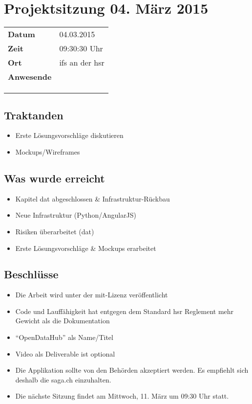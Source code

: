 \documentclass[class=scrbook,crop=false]{standalone}
\begin{document}
	
	\section{Projektsitzung 04. März 2015}
	
	\begin{tabular}{ll}
		\textbf{Datum} & 04.03.2015 \\
		\textbf{Zeit} & 09:30\textendash10:30 Uhr \\
		\textbf{Ort} & \acs{ifs} an der \acs{hsr} \\
		\textbf{Anwesende} & \proff \\ & \chuf \\ & \rlif \\ & \fscf
	\end{tabular}
	

	\subsection*{Traktanden}
	\begin{itemize}
		\item Erste Lösungsvorschläge diskutieren
		\item Mockups/Wireframes
	\end{itemize}
	
	\subsection*{Was wurde erreicht}
	\begin{itemize}
		\item Kapitel dat abgeschlossen \& Infrastruktur-Rückbau
		\item Neue Infrastruktur (Python/AngularJS)
		\item Risiken überarbeitet (dat)
		\item Erste Lösungsvorschläge \& Mockups erarbeitet
	\end{itemize}
	
	\subsection*{Beschlüsse}
	\begin{itemize}
		\item Die Arbeit wird unter der \acs{mit}-Lizenz veröffentlicht
		\item Code und Lauffähigkeit hat entgegen dem Standard \acs{hsr} Reglement mehr Gewicht als die Dokumentation
		\item ``OpenDataHub'' als Name/Titel
		\item Video als Deliverable ist optional
		\item Die Applikation sollte von den Behörden akzeptiert werden. Es empfiehlt sich deshalb die \acf{saga.ch} einzuhalten.
		\item Die nächste Sitzung findet am Mittwoch, 11. März um 09:30 Uhr statt.
	\end{itemize}
	
\end{document}
